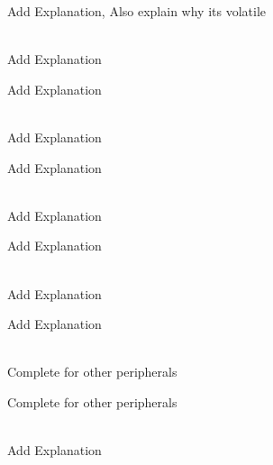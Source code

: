 \begin{DoxyRefList}
\label{todo__todo000081}%
%
Add Explanation, Also explain why its volatile  
\item[{\parbox[t]{\linewidth}{Member \doxylink{struct_g_p_i_ox___reg_def__t_acf54c3304e180a735525c8a2e7e29f40}{GPIOx\+\_\+\+Reg\+Def\+\_\+t\+::ODR} }}]\hfill \\
\label{todo__todo000016}%
%
Add Explanation 

\label{todo__todo000086}%
%
Add Explanation  
\item[{\parbox[t]{\linewidth}{Member \doxylink{struct_g_p_i_ox___reg_def__t_a3b356447d7a412130d1bc5b33cb4b7a0}{GPIOx\+\_\+\+Reg\+Def\+\_\+t\+::OSPEEDR} }}]\hfill \\
\label{todo__todo000013}%
%
Add Explanation 

\label{todo__todo000083}%
%
Add Explanation  
\item[{\parbox[t]{\linewidth}{Member \doxylink{struct_g_p_i_ox___reg_def__t_a487e307dd27a1a694f8a52f1a2df6ce6}{GPIOx\+\_\+\+Reg\+Def\+\_\+t\+::OTYPER} }}]\hfill \\
\label{todo__todo000012}%
%
Add Explanation 

\label{todo__todo000082}%
%
Add Explanation  
\item[{\parbox[t]{\linewidth}{Member \doxylink{struct_g_p_i_ox___reg_def__t_a9e83c5fefbd8c0caff3dc3dccd4cfa6f}{GPIOx\+\_\+\+Reg\+Def\+\_\+t\+::PUPDR} }}]\hfill \\
\label{todo__todo000014}%
%
Add Explanation 

\label{todo__todo000084}%
%
Add Explanation  
\item[{\parbox[t]{\linewidth}{Module \doxylink{group___p_e_r_i_p_h_e_r_a_l___r_e_s_e_t___m_a_c_r_o_s}{PERIPHERAL\+\_\+\+RESET\+\_\+\+MACROS} }}]\hfill \\
\label{todo__todo000007}%
%
Complete for other peripherals 

\label{todo__todo000075}%
%
Complete for other peripherals  
\item[{\parbox[t]{\linewidth}{Member \doxylink{group___r_c_c___r_e_g_ga74944438a086975793d26ae48d5882d4}{RCC} }}]\hfill \\
\label{todo__todo000001}%
%
Add Explanation 


\end{DoxyRefList}
